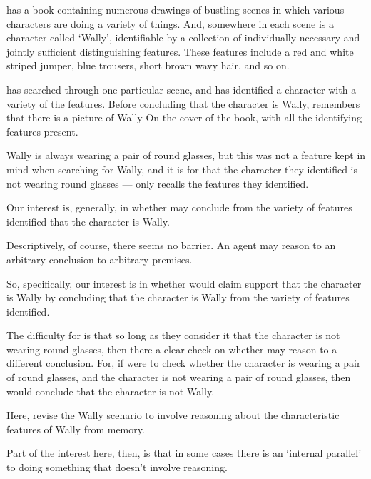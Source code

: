\begin{note}[Wally]
  \begin{illustration}
    \label{illu:CS:wheres-wally}
     has a book containing numerous drawings of bustling scenes in which various characters are doing a variety of things.
    And, somewhere in each scene is a character called `Wally', identifiable by a collection of individually necessary and jointly sufficient distinguishing features.
    These features include a red and white striped jumper, blue trousers, short brown wavy hair, and so on.

     has searched through one particular scene, and has identified a character with a variety of the features.
    Before concluding that the character is Wally,  remembers that there is a picture of Wally On the cover of the book, with all the identifying features present.

    Wally is always wearing a pair of round glasses, but this was not a feature  kept in mind when searching for Wally, and it is \epVAd{} for  that the character they identified is not wearing round glasses  ---  only recalls the features they identified.
  \end{illustration}

  Our interest is, generally, in whether  may conclude from the variety of features identified that the character is Wally.

  Descriptively, of course, there seems no barrier.
  An agent may reason to an arbitrary conclusion to arbitrary premises.

  So, specifically, our interest is in whether  would claim support that the character is Wally by concluding that the character is Wally from the variety of features identified.

  The difficulty for  is that so long as they consider it \epVAd{} that the character is not wearing round glasses, then there a clear check on whether  may reason to a different conclusion.
  For, if  were to check whether the character is wearing a pair of round glasses, and the character is not wearing a pair of round glasses, then  would conclude that the character is not Wally.
\end{note}

\begin{note}
  {
    \color{red}
    Here, revise the Wally scenario to involve reasoning about the characteristic features of Wally from memory.

    Part of the interest here, then, is that in some cases there is an `internal parallel' to doing something that doesn't involve reasoning.
  }
\end{note}

